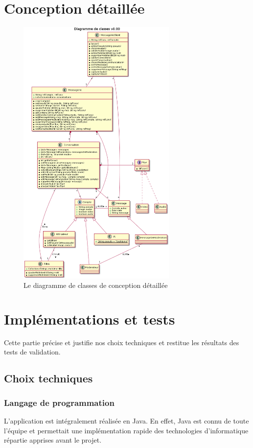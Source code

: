 \documentclass[11pt,dvipsnames,svgnames]{report}
\begin{document}
\chapter{Conception détaillée}
\begin{figure}[H]
\centerline{\includegraphics[width=0.7\textwidth]{diagrammes/detailedConception.png}}
\caption{Le diagramme de classes de conception détaillée}
\end{figure}
\chapter{Implémentations et tests}
Cette partie précise et justifie nos choix techniques et restitue les résultats des tests de validation.
\section{Choix techniques}
\subsection{Langage de programmation}
L'application est intégralement réalisée en Java. En effet, Java est connu de toute l'équipe et permettait une implémentation rapide des technologies d'informatique répartie apprises avant le projet.
\end{document}
